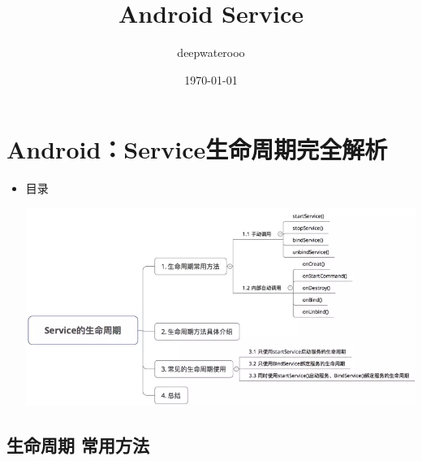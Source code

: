 \documentclass[9pt, b5paper]{article}
\author{deepwaterooo}
\date{\today}
\title{Android Service}
\begin{document}
\maketitle
\tableofcontents


\section{Android：Service生命周期完全解析}
\label{sec-1}
\begin{itemize}
\item 目录

\includegraphics[width=.9\linewidth]{./pic/serviceLifeCycle.png}
\end{itemize}
\subsection{生命周期 常用方法}
\label{sec-1-1}
\end{document}
